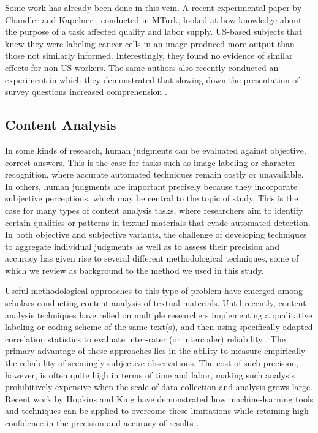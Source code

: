 \documentclass{chi2009}
\begin{document}
{Some work has already been done in this vein. A recent experimental
paper by Chandler and Kapelner \cite{chandler2010}, conducted in
MTurk, looked at how knowledge about the purpose of a task affected
quality and labor supply. US-based subjects that knew they were
labeling cancer cells in an image produced more output than those not
similarly informed.  Interestingly, they found no evidence of similar
effects for non-US workers. The same authors also recently conducted
an experiment in which they demonstrated that slowing down the presentation of 
survey questions increased comprehension \cite{kapelnerpreventing}. 
\subsection{Content Analysis}
In some kinds of research, human judgments can be evaluated against
objective, correct answers. This is the case for tasks such as image
labeling or character recognition, where accurate automated techniques
remain costly or unavailable. In others, human judgments are important
precisely because they incorporate subjective perceptions, which may
be central to the topic of study. This is the case for many types of
content analysis tasks, where researchers aim to identify certain
qualities or patterns in textual materials that evade automated
detection. In both objective and subjective variants, the challenge of
developing techniques to aggregate individual judgments as well as to
assess their precision and accuracy has given rise to several
different methodological techniques, some of which we review as
background to the method we used in this study.

Useful methodological approaches to this type of problem have emerged
among scholars conducting content analysis of textual materials. Until
recently, content analysis techniques have relied on multiple
researchers implementing a qualitative labeling or coding scheme of
the same text(s), and then using specifically adapted correlation
statistics to evaluate inter-rater (or intercoder) reliability
\cite{krippendorff_content_2003, cohen_coefficient_1960}. The primary
advantage of these approaches lies in the ability to measure
empirically the reliability of seemingly subjective observations. The
cost of such precision, however, is often quite high in terms of time
and labor, making such analysis prohibitively expensive when the scale
of data collection and analysis grows large. Recent work by Hopkins
and King have demonstrated how machine-learning tools and techniques
can be applied to overcome these limitations while retaining high
confidence in the precision and accuracy of results
\cite{Hopkins-King2010}.

}
\end{document}
